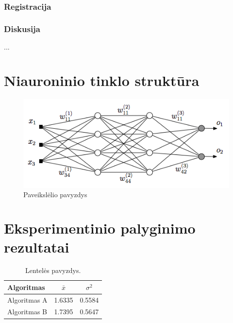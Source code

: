 \documentclass[12pt, a4paper, lithuanian]{article}
\begin{document}
\subsubsection{Registracija}
\subsubsection{Diskusija}

...



\appendix

\section{Niauroninio tinklo struktūra}
\begin{figure}[H]
    \centering
    \includegraphics[scale=0.5]{img/MLP}
    \caption{Paveikslėlio pavyzdys}
    \label{img:mlp}
\end{figure}


\section{Eksperimentinio palyginimo rezultatai}
\begin{table}[H]\footnotesize
  \centering
  \caption{Lentelės pavyzdys.}
  {\begin{tabular}{|l|c|c|} \hline
    Algoritmas & $\bar{x}$ & $\sigma^{2}$ \\
    \hline
    Algoritmas A  & 1.6335    & 0.5584       \\
    Algoritmas B  & 1.7395    & 0.5647       \\
    \hline
  \end{tabular}}
  \label{tab:table example}
\end{table}
\end{document}
